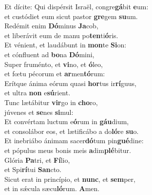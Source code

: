 \evenverse Et dícite: Qui dispérsit Israël, congre\textbf{gá}bit \textbf{e}um:~\*\\
\evenverse et custódiet eum sicut pastor \textbf{gre}gem \textbf{su}um.\\
\oddverse Redémit enim \textbf{Dó}minus \textbf{Ja}cob,~\*\\
\oddverse et liberávit eum de manu po\textbf{ten}ti\textbf{ó}ris.\\
\evenverse Et vénient, et laudábunt in \textbf{mon}te \textbf{Si}on:~\*\\
\evenverse et cónfluent ad \textbf{bo}na \textbf{Dó}mini,\\
\oddverse Super fruménto, et \textbf{vi}no, et \textbf{ó}leo,~\*\\
\oddverse et fœtu pécorum et \textbf{ar}men\textbf{tó}rum:\\
\evenverse Erítque ánima eórum quasi \textbf{hor}tus ir\textbf{rí}guus,~\*\\
\evenverse et ultra \textbf{non} e\textbf{sú}rient.\\
\oddverse Tunc lætábitur \textbf{vir}go in \textbf{cho}ro,~\*\\
\oddverse júvenes et \textbf{se}nes \textbf{si}mul:\\
\evenverse Et convértam luctum e\textbf{ó}rum in \textbf{gáu}dium,~\*\\
\evenverse et consolábor eos, et lætificábo a do\textbf{ló}re \textbf{su}o.\\
\oddverse Et inebriábo ánimam sacer\textbf{dó}tum pin\textbf{gué}dine:~\*\\
\oddverse et pópulus meus bonis meis \textbf{a}dim\textbf{plé}bitur.\\
\evenverse Glória \textbf{Pa}tri, et \textbf{Fí}lio,~\*\\
\evenverse et Spi\textbf{rí}tui \textbf{San}cto.\\
\oddverse Sicut erat in princípio, et \textbf{nunc}, et \textbf{sem}per,~\*\\
\oddverse et in sǽcula sæcu\textbf{ló}rum. \textbf{A}men.\\
